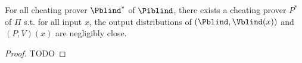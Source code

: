 \begin{theorem}
	For all cheating prover $\Pblind^*$ of $\Piblind$, there exists a cheating prover $P^*$ of $\Pi$ s.t. for all input $x$, the output distributions of $(\Pblind, \Vblind(x))$ and $(P, V)(x)$ are negligibly close.
\end{theorem}
\begin{proof}
	TODO
\end{proof}
